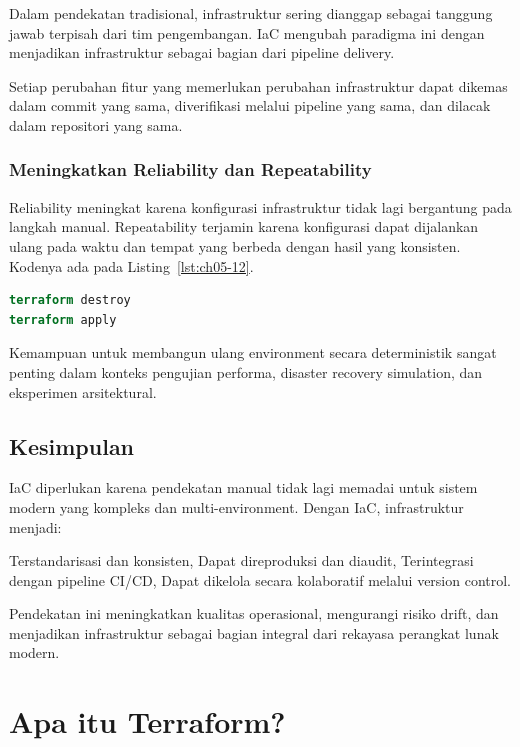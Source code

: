 Dalam pendekatan tradisional, infrastruktur sering dianggap sebagai tanggung jawab terpisah dari tim pengembangan. IaC mengubah paradigma ini dengan menjadikan infrastruktur sebagai bagian dari pipeline delivery.

Setiap perubahan fitur yang memerlukan perubahan infrastruktur dapat dikemas dalam commit yang sama, diverifikasi melalui pipeline yang sama, dan dilacak dalam repositori yang sama.

\subsubsection*{Meningkatkan Reliability dan Repeatability}

Reliability meningkat karena konfigurasi infrastruktur tidak lagi bergantung pada langkah manual. Repeatability terjamin karena konfigurasi dapat dijalankan ulang pada waktu dan tempat yang berbeda dengan hasil yang konsisten. Kodenya ada pada Listing~\ref{lst:ch05-12}.

\begin{lstlisting}[language=terraform, caption={Potongan kode Terraform pada Meningkatkan Reliability dan Repeatability}, label={lst:ch05-12}]
terraform destroy
terraform apply
\end{lstlisting}

Kemampuan untuk membangun ulang environment secara deterministik sangat penting dalam konteks pengujian performa, disaster recovery simulation, dan eksperimen arsitektural.

\subsection*{Kesimpulan}

IaC diperlukan karena pendekatan manual tidak lagi memadai untuk sistem modern yang kompleks dan multi-environment. Dengan IaC, infrastruktur menjadi:

Terstandarisasi dan konsisten,  
Dapat direproduksi dan diaudit,  
Terintegrasi dengan pipeline CI/CD,  
Dapat dikelola secara kolaboratif melalui version control.  

Pendekatan ini meningkatkan kualitas operasional, mengurangi risiko drift, dan menjadikan infrastruktur sebagai bagian integral dari rekayasa perangkat lunak modern.

\section{Apa itu Terraform?}

